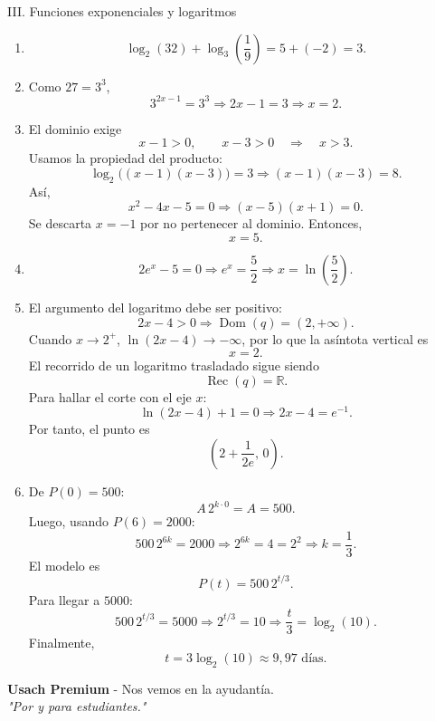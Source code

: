 \documentclass[letterpaper,12pt]{article}
\newcommand{\Dom}{\operatorname{Dom}}
\newcommand{\Rec}{\operatorname{Rec}}
\newcommand{\R}{\mathbb{R}}
\begin{document}
\begin{solbox}{III. Funciones exponenciales y logaritmos}
\begin{enumerate}[label=\color{azulFuerte}\textbf{\arabic*.},leftmargin=*,start=13,itemsep=1em]
    \item
    \[
    \log_2(32)+\log_3\left(\frac19\right)
    =5+(-2)
    =\boxed{3}.
    \]

    \item Como \(27=3^3\),
    \[
    3^{2x-1}=3^3
    \Longrightarrow
    2x-1=3
    \Longrightarrow
    \boxed{x=2}.
    \]

    \item El dominio exige
    \[
        x-1>0,\qquad x-3>0
        \quad\Longrightarrow\quad x>3.
    \]
    Usamos la propiedad del producto:
    \[
    \log_2\bigl((x-1)(x-3)\bigr)=3
    \Longrightarrow
    (x-1)(x-3)=8.
    \]
    Así,
    \[
    x^2-4x-5=0
    \Longrightarrow
    (x-5)(x+1)=0.
    \]
    Se descarta \(x=-1\) por no pertenecer al dominio. Entonces,
    \[
        \boxed{x=5}.
    \]

    \item
    \[
    2e^x-5=0
    \Longrightarrow
    e^x=\frac52
    \Longrightarrow
    \boxed{x=\ln\left(\frac52\right)}.
    \]

    \item El argumento del logaritmo debe ser positivo:
    \[
        2x-4>0
        \Longrightarrow
        \boxed{\Dom(q)=(2,+\infty)}.
    \]
    Cuando \(x\to2^+\), \(\ln(2x-4)\to-\infty\), por lo que la asíntota vertical es
    \[
        \boxed{x=2}.
    \]
    El recorrido de un logaritmo trasladado sigue siendo
    \[
        \boxed{\Rec(q)=\R}.
    \]
    Para hallar el corte con el eje \(x\):
    \[
    \ln(2x-4)+1=0
    \Longrightarrow
    2x-4=e^{-1}.
    \]
    Por tanto, el punto es
    \[
        \boxed{\left(2+\frac{1}{2e},\,0\right)}.
    \]

    \item De \(P(0)=500\):
    \[
        A\,2^{k\cdot0}=A=500.
    \]
    Luego, usando \(P(6)=2000\):
    \[
    500\,2^{6k}=2000
    \Longrightarrow
    2^{6k}=4=2^2
    \Longrightarrow
    k=\frac13.
    \]
    El modelo es
    \[
        \boxed{P(t)=500\,2^{t/3}}.
    \]
    Para llegar a \(5000\):
    \[
    500\,2^{t/3}=5000
    \Longrightarrow
    2^{t/3}=10
    \Longrightarrow
    \frac{t}{3}=\log_2(10).
    \]
    Finalmente,
    \[
        \boxed{t=3\log_2(10)\approx9{,}97\text{ días}}.
    \]
\end{enumerate}
\end{solbox}

\vspace{0.8cm}
\begin{center}
    \small\textbf{Usach Premium} - Nos vemos en la ayudantía.\\
    \textit{"Por y para estudiantes."}
\end{center}
\end{document}
